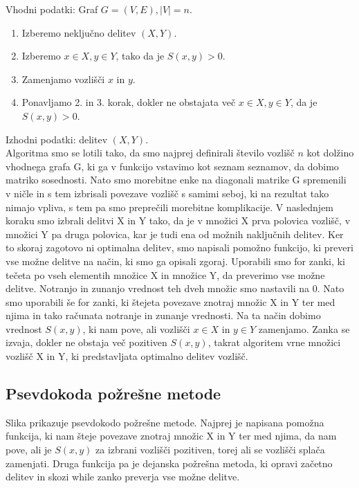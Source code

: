 \documentclass[12pt,a4paper]{amsart}
\theoremstyle{definition} %
\theoremstyle{plain} %
\begin{document}
Vhodni podatki: Graf $G=(V,E), |V|=n$.
\begin{enumerate}
\item Izberemo neključno delitev $(X,Y)$.
\item Izberemo $x\in X, y\in Y$, tako da je $S(x,y)>0$.
\item Zamenjamo vozlišči $x$ in $y$.
\item Ponavljamo 2. in 3. korak, dokler ne obstajata več $x\in X, y\in Y$, da je $S(x,y)>0$.
\end{enumerate}
Izhodni podatki: delitev $(X,Y)$. \\

Algoritma smo se lotili tako, da smo najprej definirali število vozlišč $n$ kot dolžino vhodnega grafa G, ki ga v funkcijo vstavimo kot seznam seznamov, da dobimo matriko sosednosti. Nato smo morebitne enke na diagonali matrike G spremenili v ničle in s tem izbrisali povezave vozlišč s samimi seboj, ki na rezultat tako nimajo vpliva, s tem pa smo preprečili morebitne komplikacije. V naslednjem koraku smo izbrali delitvi X in Y tako, da je v množici X prva polovica vozlišč, v množici Y pa druga polovica, kar je tudi ena od možnih naključnih delitev. Ker to skoraj zagotovo ni optimalna delitev, smo napisali pomožno funkcijo, ki preveri vse možne delitve na način, ki smo ga opisali zgoraj. Uporabili smo for zanki, ki tečeta po vseh elementih množice X in množice Y, da preverimo vse možne delitve. Notranjo in zunanjo vrednost teh dveh množic smo nastavili na 0. Nato smo uporabili še for zanki, ki štejeta povezave znotraj množic X in Y ter med njima in tako računata notranje in zunanje vrednosti. Na ta način dobimo vrednost $S(x,y)$, ki nam pove, ali vozlišči $x\in X$ in $y\in Y$ zamenjamo. Zanka se izvaja, dokler ne obstaja več pozitiven $S(x,y)$, takrat algoritem vrne množici vozlišč X in Y, ki predstavljata optimalno delitev vozlišč.

\newpage

\subsection{Psevdokoda požrešne metode}

Slika prikazuje psevdokodo požrešne metode. Najprej je napisana pomožna funkcija, ki nam šteje povezave znotraj množic X in Y ter med njima, da nam pove, ali je $S(x,y)$ za izbrani vozlišči pozitiven, torej ali se vozlišči splača zamenjati. Druga funkcija pa je dejanska požrešna metoda, ki opravi začetno delitev in skozi while zanko preverja vse možne delitve.
\end{document}

